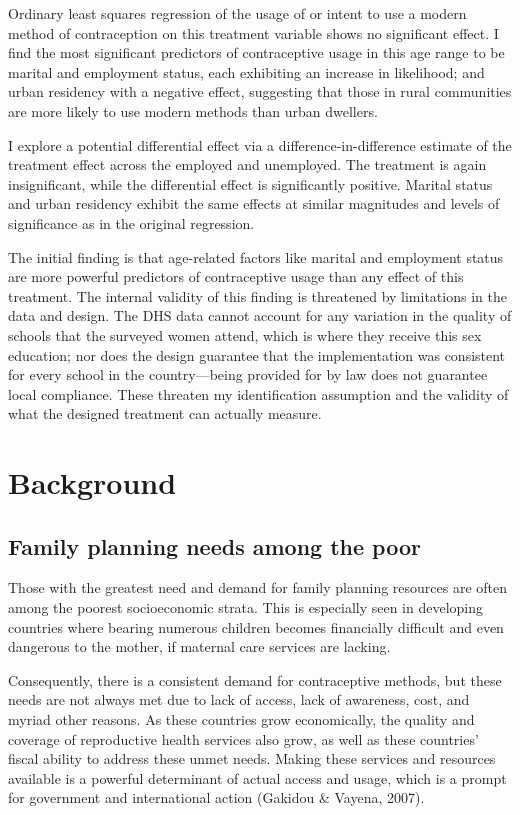 \documentclass[12pt]{article}
\begin{document}
Ordinary least squares regression of the usage of or intent to use a modern method of contraception on this treatment variable shows no significant effect.
I find the most significant predictors of contraceptive usage in this age range to be marital and employment status, each exhibiting an increase in likelihood; and urban residency with a negative effect, suggesting that those in rural communities are more likely to use modern methods than urban dwellers.

I explore a potential differential effect via a difference-in-difference estimate of the treatment effect across the employed and unemployed.
The treatment is again insignificant, while the differential effect is significantly positive.
Marital status and urban residency exhibit the same effects at similar magnitudes and levels of significance as in the original regression.

The initial finding is that age-related factors like marital and employment status are more powerful predictors of contraceptive usage than any effect of this treatment.
The internal validity of this finding is threatened by limitations in the data and design.
The DHS data cannot account for any variation in the quality of schools that the surveyed women attend, which is where they receive this sex education; nor does the design guarantee that the implementation was consistent for every school in the country---being provided for by law does not guarantee local compliance.
These threaten my identification assumption and the validity of what the designed treatment can actually measure.


\section{Background}
    \subsection{Family planning needs among the poor}
    Those with the greatest need and demand for family planning resources are often among the poorest socioeconomic strata.
    This is especially seen in developing countries where bearing numerous children becomes financially difficult and even dangerous to the mother, if maternal care services are lacking.

    Consequently, there is a consistent demand for contraceptive methods, but these needs are not always met due to lack of access, lack of awareness, cost, and myriad other reasons.
    As these countries grow economically, the quality and coverage of reproductive health services also grow, as well as these countries' fiscal ability to address these unmet needs.
    Making these services and resources available is a powerful determinant of actual access and usage, which is a prompt for government and international action (Gakidou \& Vayena, 2007).
\end{document}
